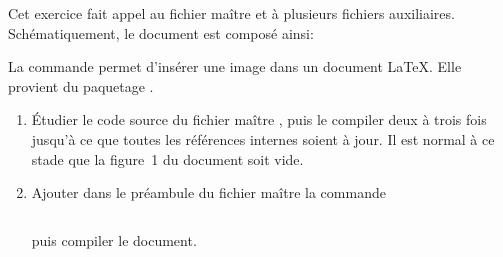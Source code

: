 \begin{exercice}[nosol]
  \label{ex:include}
  Cet exercice fait appel au fichier maître
   et à plusieurs fichiers auxiliaires.
  Schématiquement, le document est composé ainsi:

  \medskip
  \begin{minipage}{\linewidth}
  \end{minipage}
  \medskip

  La commande  permet d'insérer une image dans
  un document {\LaTeX}. Elle provient du paquetage .

  \begin{enumerate}
  \item Étudier le code source du fichier maître
    , puis le compiler deux à trois
    fois jusqu'à ce que toutes les références internes soient à jour.
    Il est normal à ce stade que la figure~1 du document soit vide.
  \item Ajouter dans le préambule du fichier maître la commande
\begin{lstlisting}

\end{lstlisting}
    puis compiler le document.


\end{enumerate}
\end{exercice}
